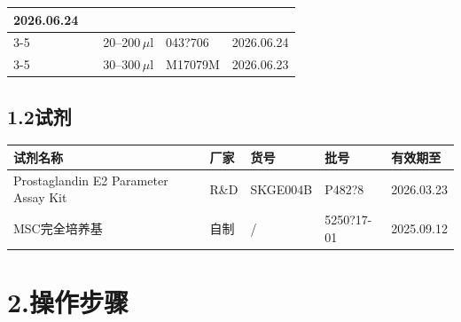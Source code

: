\documentclass[UTF8,10pt,a4paper,fontset=fandol]{ctexart}
\newcommand{\fieldvalue}[1]{#1}
\newcommand{\handwritten}[1]{#1}
\begin{document}
\begin{tabularx}{\textwidth}{|X|X|X|X|X|}
\fieldvalue{\handwritten{2026.06.24}}
\\ \cline{3-5}
 & &
\fieldvalue{\handwritten{20--200\,\(\mu\)l}} &
\fieldvalue{\handwritten{043?706}} &
\fieldvalue{\handwritten{2026.06.24}}
\\ \cline{3-5}
 & &
\fieldvalue{\handwritten{30--300\,\(\mu\)l}} &
\fieldvalue{\handwritten{M17079M}} &
\fieldvalue{\handwritten{2026.06.23}}
\\ \hline
\end{tabularx}
\normalsize

\subsection*{1.2\quad 试剂}

\begin{tabularx}{\textwidth}{|X|l|X|X|X|}
\hline
试剂名称 & 厂家 & 货号 & 批号 & 有效期至 \\ \hline
\fieldvalue{Prostaglandin E2 Parameter Assay Kit} &
\fieldvalue{R\&D} &
\fieldvalue{SKGE004B} &
\fieldvalue{\handwritten{P482?8}} &
\fieldvalue{\handwritten{2026.03.23}}
\\ \hline
\fieldvalue{MSC完全培养基} &
\fieldvalue{自制} &
\fieldvalue{/} &
\fieldvalue{\handwritten{5250?17-01}} &
\fieldvalue{\handwritten{2025.09.12}}
\\ \hline
\end{tabularx}

\section*{2.\quad 操作步骤}
\end{document}
